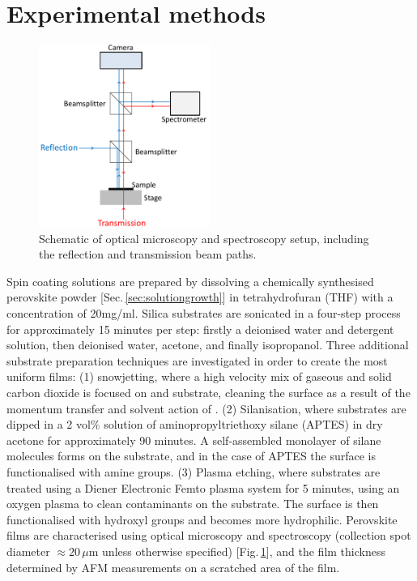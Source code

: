 \section{Experimental methods}
\label{sec:glass}
\begin{figure}[h!]
\centering    
\includegraphics[width=0.5\textwidth]{Microscope}
\caption{Schematic of optical microscopy and spectroscopy setup, including the reflection and transmission beam paths.}
\label{Microscope}
\end{figure}
Spin coating solutions are prepared by dissolving a chemically synthesised perovskite powder [Sec.\,\ref{sec:solutiongrowth}] in tetrahydrofuran (THF) with a concentration of 20mg/ml. Silica substrates are sonicated in a four-step process for approximately 15 minutes per step: firstly a deionised water and detergent solution, then deionised water, acetone, and finally isopropanol. Three additional substrate preparation techniques are investigated in order to create the most uniform films: (1)  snowjetting, where a high velocity mix of gaseous and solid carbon dioxide is focused on and substrate, cleaning the surface as a result of the momentum transfer and solvent action of  \cite{Snowjet}. (2) Silanisation, where substrates are dipped in a 2 vol\% solution of aminopropyltriethoxy silane (APTES) in dry acetone for approximately 90 minutes. A self-assembled monolayer of silane molecules forms on the substrate, and in the case of APTES the surface is functionalised with amine groups. (3) Plasma etching, where substrates are treated using a Diener Electronic Femto plasma system for 5 minutes, using an oxygen plasma to clean contaminants on the substrate. The surface is then functionalised with hydroxyl groups and becomes more hydrophilic. Perovskite films are characterised using optical microscopy and spectroscopy (collection spot diameter $\approx 20\,\mu$m unless otherwise specified) [Fig.\,\ref{Microscope}], and the film thickness determined by AFM measurements on a scratched area of the film.

